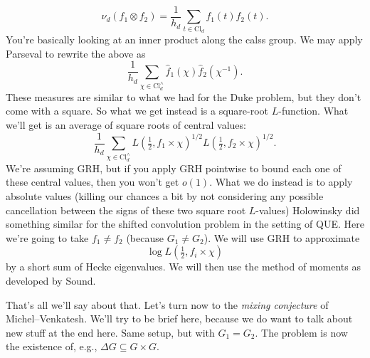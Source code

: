 \documentclass[reqno]{amsart} 
\begin{document}
\begin{equation*}
  \nu_d (f_1 \otimes f_2 ) = \frac{1}{ h_d } \sum_{t \in \mathrm{Cl}_d } f_1 (t ) f_2 (t).
\end{equation*}
You're basically looking at an inner product along the calss group.  We may apply Parseval to rewrite the above as
\begin{equation*}
  \frac{1}{ h_d } \sum_{\chi  \in \mathrm{Cl}_d^\wedge  } \hat{f}_1 (\chi  ) \hat{f}_2 (\chi^{-1} ).
\end{equation*}
These measures are similar to what we had for the Duke problem, but they don't come with a square.  So what we get instead is a square-root $L$-function.  What we'll get is an average of square roots of central values:
\begin{equation*}
  \frac{1}{ h_d } \sum_{\chi \in \mathrm{Cl}^\wedge_d } L (\tfrac{1}{2}, f_1 \times \chi )^{1/2}
  L (\tfrac{1}{2}, f_2 \times \chi )^{1/2}.
\end{equation*}
We're assuming GRH, but if you apply GRH pointwise to bound each one of these central values, then you won't get $o(1)$.  What we do instead is to apply absolute values (killing our chances a bit by not considering any possible cancellation between the signs of these two square root $L$-values) Holowinsky did something similar for the shifted convolution problem in the setting of QUE.  Here we're going to take $f_1 \neq f_2 $ (because $G_1 \neq G_2 $).  We will use GRH to approximate
\begin{equation*}
  \log L (\tfrac{1}{2}, f_i \times \chi )
\end{equation*}
by a short sum of Hecke eigenvalues.  We will then use the method of moments as developed by Sound.

That's all we'll say about that.  Let's turn now to the \emph{mixing conjecture} of Michel--Venkatesh.  We'll try to be brief here, because we do want to talk about new stuff at the end here.  Same setup, but with $G_1 = G_2$.  The problem is now the existence of, e.g., $\Delta G \subseteq G \times G$.
\end{document}
